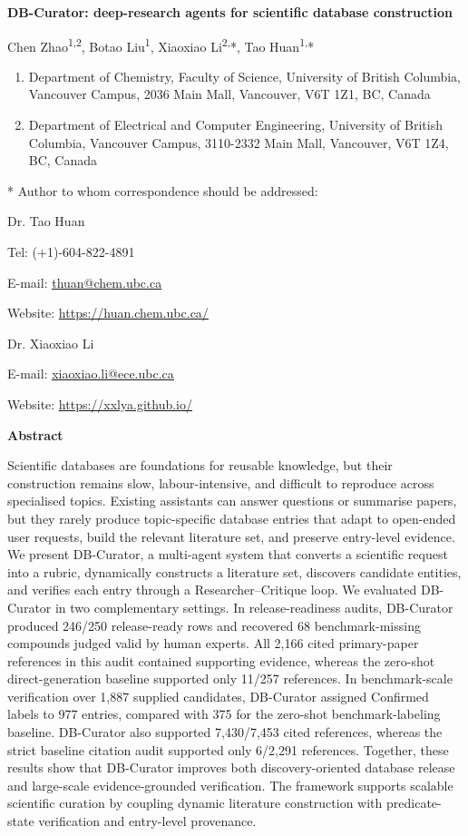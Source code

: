\documentclass[
]{article}
\author{}
\date{}
\begin{document}
\textbf{DB-Curator: deep-research agents for scientific database
construction}

Chen Zhao\textsuperscript{1,2}, Botao Liu\textsuperscript{1}, Xiaoxiao Li\textsuperscript{2,}*, Tao
Huan\textsuperscript{1,}*

\begin{enumerate}
\def\labelenumi{\arabic{enumi}.}
\item
  Department of Chemistry, Faculty of Science, University of British
  Columbia, Vancouver Campus, 2036 Main Mall, Vancouver, V6T 1Z1, BC, Canada
\item
  Department of Electrical and Computer Engineering, University of
  British Columbia, Vancouver Campus, 3110-2332 Main Mall, Vancouver,
  V6T 1Z4, BC, Canada
\end{enumerate}

* Author to whom correspondence should be addressed:

Dr. Tao Huan

Tel: (+1)-604-822-4891

E-mail: \href{mailto:thuan@chem.ubc.ca}{\uline{thuan@chem.ubc.ca}}

Website:
\href{https://huan.chem.ubc.ca/}{\uline{https://huan.chem.ubc.ca/}}

Dr. Xiaoxiao Li

E-mail: \href{mailto:xiaoxiao.li@ece.ubc.ca}{\uline{xiaoxiao.li@ece.ubc.ca}}

Website: \href{https://xxlya.github.io/}{\uline{https://xxlya.github.io/}}

\textbf{Abstract}

Scientific databases are foundations for reusable knowledge, but their
construction remains slow, labour-intensive, and difficult to reproduce
across specialised topics. Existing assistants can answer questions or
summarise papers, but they rarely produce topic-specific database entries
that adapt to open-ended user requests, build the relevant literature set,
and preserve entry-level evidence. We present DB-Curator, a multi-agent
system that converts a scientific request into a rubric, dynamically
constructs a literature set, discovers candidate entities, and verifies
each entry through a Researcher--Critique loop. We evaluated DB-Curator in
two complementary settings. In release-readiness audits, DB-Curator
produced 246/250 release-ready rows and recovered 68 benchmark-missing
compounds judged valid by human experts. All 2,166 cited primary-paper
references in this audit contained supporting evidence, whereas the
zero-shot direct-generation baseline supported only 11/257 references. In
benchmark-scale verification over 1,887 supplied candidates, DB-Curator
assigned Confirmed labels to 977 entries, compared with 375 for the
zero-shot benchmark-labeling baseline. DB-Curator also supported
7,430/7,453 cited references, whereas the strict baseline citation audit
supported only 6/2,291 references. Together, these results show that
DB-Curator improves both discovery-oriented database release and
large-scale evidence-grounded verification. The framework supports
scalable scientific curation by coupling dynamic literature construction
with predicate-state verification and entry-level provenance.
\end{document}

